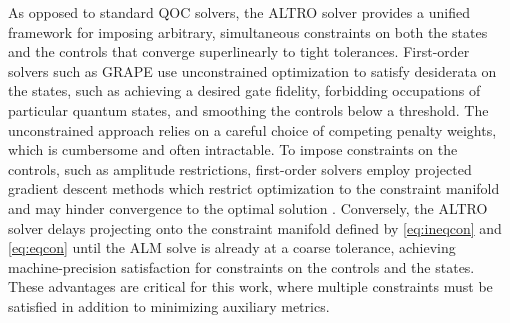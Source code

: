 As opposed to standard QOC solvers, the ALTRO solver provides a unified framework
for imposing arbitrary, simultaneous constraints
on both the states and the controls that converge superlinearly to tight tolerances. 
First-order solvers such as GRAPE
use unconstrained optimization to satisfy desiderata on the states,
such as achieving a desired gate fidelity, forbidding occupations of particular quantum states,
and smoothing the controls below a threshold. The unconstrained approach relies
on a careful choice of competing penalty weights, which is cumbersome and often intractable.
To impose constraints on the controls, such as amplitude restrictions, first-order solvers
employ projected gradient descent methods which restrict
optimization to the constraint manifold and
may hinder convergence to the optimal solution \cite{clarkson2010coresets,
  hauswirth2016projected}.
Conversely,
the ALTRO solver delays projecting onto the constraint manifold defined by
\eqref{eq:ineqcon} and \eqref{eq:eqcon} until the ALM
solve is already at a coarse tolerance, achieving machine-precision satisfaction
for constraints on the controls and the states. These advantages are critical
for this work, where multiple constraints must be satisfied in addition
to minimizing auxiliary metrics.


